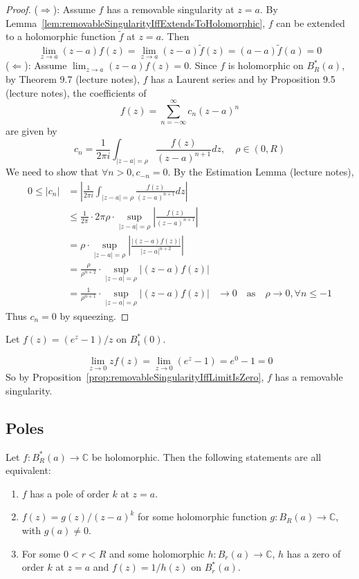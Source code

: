 \begin{proof}
	($\Rightarrow$): Assume $f$ has a removable singularity at $z = a$. By Lemma~\ref{lem:removableSingularityIffExtendsToHolomorphic}, $f$ can be extended to a holomorphic function $\tilde{f}$ at $z = a$. Then
	\[
		\lim_{z \to a} (z - a) f(z) = \lim_{z \to a} (z - a) \tilde{f}(z) = (a - a) \tilde{f} (a) = 0
	\]
	($\Leftarrow$): Assume $\lim_{z \to a} (z - a) f(z) = 0$. Since $f$ is holomorphic on $B_R^*(a)$, by Theorem 9.7 (lecture notes), $f$ has a Laurent series and by Proposition 9.5 (lecture notes), the coefficients of
	\[
		f(z) = \sum_{n = -\infty}^{\infty} c_n {(z - a)}^n
	\]
	are given by
	\[
		c_n = \frac{1}{2 \pi i} \int_{|z - a| = \rho} \frac{f(z)}{{(z - a)}^{n + 1}} dz, \quad \rho \in (0, R)
	\]
	We need to show that $\forall n > 0, c_{-n} = 0$. By the Estimation Lemma (lecture notes),
	\[
		\begin{aligned}
			0 \le |c_n| & = \left| \frac{1}{2 \pi i} \int_{|z - a| = \rho} \frac{f(z)}{{(z - a)}^{n + 1}} dz \right| \\
			& \le \frac{1}{2 \pi} \cdot 2 \pi \rho \cdot \sup_{|z - a| = \rho} \left| \frac{f(z)}{{(z - a)}^{n + 1}} \right| \\
			& = \rho \cdot \sup_{|z - a| = \rho} \left| \frac{|(z - a) f(z)|}{|z - a|^{n + 2}} \right| \\
			& = \frac{\rho}{\rho^{n + 2}} \cdot \sup_{|z - a| = \rho} \left| (z - a) f(z) \right| \\
			& = \frac{1}{\rho^{n + 1}} \cdot \sup_{|z - a| = \rho} \left| (z - a) f(z) \right|
			& \to 0 \quad \text{as} \quad \rho \to 0, \forall n \le -1
		\end{aligned}
	\]
	Thus $c_n = 0$ by squeezing.
\end{proof}

\begin{example}
	Let $f(z) = (e^z - 1) / z$ on $B_1^*(0)$.

	\[
		\lim_{z \rightarrow 0} z f(z) = \lim_{z \to 0} (e^z - 1) = e^0 - 1 = 0
	\]
	So by Proposition~\ref{prop:removableSingularityIffLimitIsZero}, $f$ has a removable singularity.
\end{example}

\subsection{Poles}

\begin{proposition}
	Let $f: B_R^*(a) \rightarrow \mathbb{C}$ be holomorphic. Then the following statements are all equivalent:
	\begin{enumerate}
		\item $f$ has a pole of order $k$ at $z = a$.
		\item $f(z) = g(z) / {(z - a)}^k$ for some holomorphic function $g: B_R(a) \rightarrow \mathbb{C}$, with $g(a) \ne 0$.
		\item For some $0 < r < R$ and some holomorphic $h: B_r(a) \rightarrow \mathbb{C}$, $h$ has a zero of order $k$ at $z = a$ and $f(z) = 1 / h(z)$ on $B_r^*(a)$.
	\end{enumerate}
\end{proposition}

